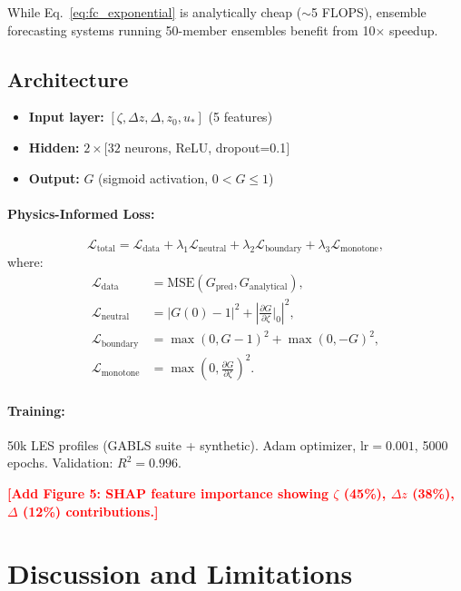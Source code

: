\documentclass[twocolumn,11pt]{article}
\newcommand{\TODO}[1]{\textcolor{red}{\textbf{[#1]}}}
\begin{document}
While Eq.~\eqref{eq:fc_exponential} is analytically cheap ($\sim$5 FLOPS), ensemble forecasting systems running 50-member ensembles benefit from 10$\times$ speedup.

\subsection{Architecture}

\begin{itemize}
\item \textbf{Input layer:} $[\zeta, \Delta z, \Delta, z_0, u_*]$ (5 features)
\item \textbf{Hidden:} $2 \times [32$ neurons, ReLU, dropout=0.1$]$
\item \textbf{Output:} $G$ (sigmoid activation, $0 < G \leq 1$)
\end{itemize}

\paragraph{Physics-Informed Loss:}
\begin{equation}
\mathcal{L}_{\text{total}} = \mathcal{L}_{\text{data}} + \lambda_1 \mathcal{L}_{\text{neutral}} + \lambda_2 \mathcal{L}_{\text{boundary}} + \lambda_3 \mathcal{L}_{\text{monotone}},
\end{equation}
where:
\begin{align}
\mathcal{L}_{\text{data}} &= \text{MSE}(G_{\text{pred}}, G_{\text{analytical}}), \\
\mathcal{L}_{\text{neutral}} &= |G(0) - 1|^2 + \left|\frac{\partial G}{\partial \zeta}\Big|_0\right|^2, \\
\mathcal{L}_{\text{boundary}} &= \max(0, G-1)^2 + \max(0, -G)^2, \\
\mathcal{L}_{\text{monotone}} &= \max\left(0, \frac{\partial G}{\partial \zeta}\right)^2.
\end{align}

\paragraph{Training:} 50k LES profiles (GABLS suite + synthetic). Adam optimizer, $\text{lr}=0.001$, 5000 epochs. Validation: $R^2 = 0.996$.

\TODO{Add Figure 5: SHAP feature importance showing $\zeta$ (45\%), $\Delta z$ (38\%), $\Delta$ (12\%) contributions.}

\section{Discussion and Limitations}
\label{sec:discussion}
\end{document}
